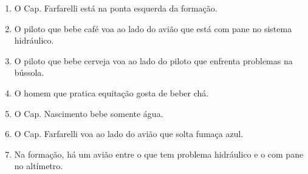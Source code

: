 \documentclass[a4paper,12pt]{article}
\begin{document}
\begin{description}
\begin{enumerate}
  \item  O Cap. Farfarelli está na ponta esquerda da formação.
  \item O piloto que bebe café voa ao lado do avião que está com pane no sistema hidráulico.
  \item O piloto que bebe cerveja voa ao lado do piloto que enfrenta problemas na bússola.
  \item O homem que pratica equitação gosta de beber chá.
  \item O Cap. Nascimento bebe somente água.
  \item O Cap. Farfarelli voa ao lado do avião que solta fumaça azul.
  \item Na formação, há um avião entre o que tem problema hidráulico e o com pane no altímetro.
  
 \end{enumerate}  
 
\end{description}
\end{document}
